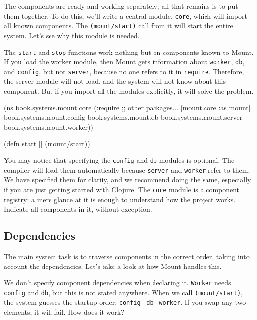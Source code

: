 
The components are ready and working separately; all that remains is to put them together. To do this, we'll write a central module, \verb|core|, which will import all known components. The \verb|(mount/start)| call from it will start the entire system. Let's see why this module is needed.

The \verb|start| and \verb|stop| functions work nothing but on components known to Mount. If you load the worker module, then Mount gets information about \verb|worker|, \verb|db|, and \verb|config|, but not \verb|server|, because no one refers to it in \verb|require|. Therefore, the server module will not load, and the system will not know about this component. But if you import all the modules explicitly, it will solve the problem.

\label{mount-main}

\begin{english}
  \begin{clojure}
(ns book.systems.mount.core
  (:require
   ;; other packages...
   [mount.core :as mount]
   book.systems.mount.config
   book.systems.mount.db
   book.systems.mount.server
   book.systems.mount.worker))

(defn start []
  (mount/start))
  \end{clojure}
\end{english}

You may notice that specifying the \verb|config| and \verb|db| modules is optional. The compiler will load them automatically because \verb|server| and \verb|worker| refer to them. We have specified them for clarity, and we recommend doing the same, especially if you are just getting started with Clojure. The \verb|core| module is a component registry: a mere glance at it is enough to understand how the project works. Indicate all components in it, without exception.

\subsection{Dependencies}


The main system task is to traverse components in the correct order, taking into account the dependencies. Let's take a look at how Mount handles this.

We don't specify component dependencies when declaring it. \verb|Worker| needs \verb|config| and \verb|db|, but this is not stated anywhere. When we call \verb|(mount/start)|, the system guesses the startup order: \verb|config|~\arr{} \verb|db|~\arr{} \verb|worker|. If you swap any two elements, it will fail. How does it work?

